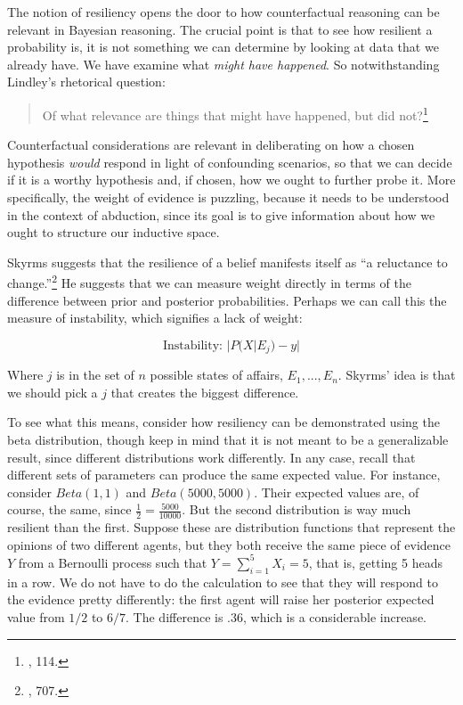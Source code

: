 The notion of resiliency opens the door to how counterfactual reasoning
can be relevant in Bayesian reasoning. The crucial point is that to see
how resilient a probability is, it is not something we can determine by
looking at data that we already have. We have examine what \emph{might
have happened}. So notwithstanding Lindley's rhetorical question:

\begin{quote}
Of what relevance are things that might have happened, but did
not?\footnote{\cite{lindleybern}, 114.}
\end{quote}

Counterfactual considerations are relevant in deliberating on how a
chosen hypothesis \emph{would} respond in light of confounding
scenarios, so that we can decide if it is a worthy hypothesis and, if
chosen, how we ought to further probe it. More specifically, the weight
of evidence is puzzling, because it needs to be understood in the
context of abduction, since its goal is to give information about how we
ought to structure our inductive space.

Skyrms suggests that the resilience of a belief manifests itself as ``a
reluctance to change.''\footnote{\cite{causationandconditional}, 707.} He suggests that we can measure weight
directly in terms of the difference between prior and posterior
probabilities. Perhaps we can call this the measure of instability,
which signifies a lack of weight:

\[\text{Instability: }|P(X|E_j) - y|\]

Where \(j\) is in the set of \(n\) possible states of affairs,
\(E_1,..., E_n\). Skyrms' idea is that we should pick a \(j\) that
creates the biggest difference.

To see what this means, consider how resiliency can be demonstrated
using the beta distribution, though keep in mind that it is not meant to
be a generalizable result, since different distributions work
differently. In any case, recall that different sets of parameters can
produce the same expected value. For instance, consider \(Beta(1,1)\)
and \(Beta(5000,5000)\). Their expected values are, of course, the same,
since \(\frac{1}{2} = \frac{5000}{10000}\). But the second distribution
is way much resilient than the first. Suppose these are distribution
functions that represent the opinions of two different agents, but they
both receive the same piece of evidence \(Y\) from a Bernoulli process
such that \(Y=\sum_{i=1}^5 X_i=5\), that is, getting 5 heads in a row.
We do not have to do the calculation to see that they will respond to
the evidence pretty differently: the first agent will raise her
posterior expected value from \(1/2\) to \(6/7\). The difference is
\(.36\), which is a considerable increase.

